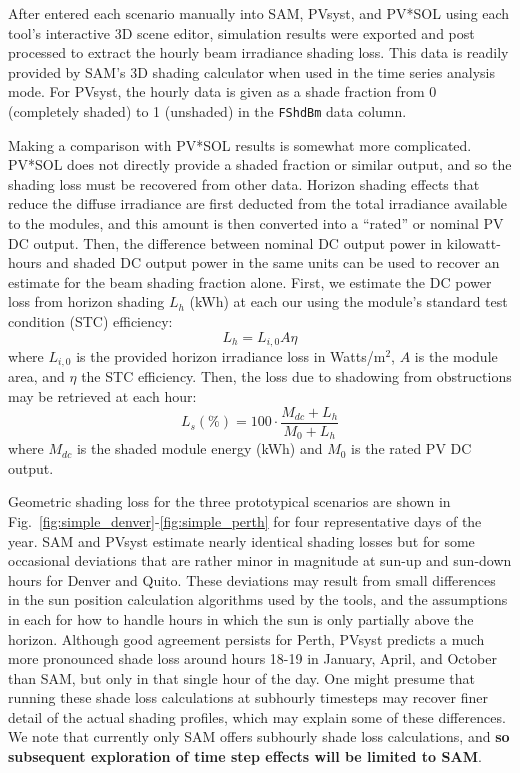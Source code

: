 \documentclass[twocolumn,10pt]{asme2ej}
\begin{document}
After entered each scenario manually into SAM, PVsyst, and PV*SOL using each tool's interactive 3D scene editor, simulation results were exported and post processed to extract the hourly beam irradiance shading loss.  This data is readily provided by SAM's 3D shading calculator when used in the time series analysis mode.  For PVsyst, the hourly data is given as a shade fraction from 0 (completely shaded) to 1 (unshaded) in the \texttt{FShdBm} data column. 

Making a comparison with PV*SOL results is somewhat more complicated.  PV*SOL does not directly provide a shaded fraction or similar output, and so the shading loss must be recovered from other data.  Horizon shading effects that reduce the diffuse irradiance are first deducted from the total irradiance available to the modules, and this amount is then converted into a ``rated'' or nominal PV DC output.  Then, the difference between nominal DC output power in kilowatt-hours and shaded DC output power in the same units can be used to recover an estimate for the beam shading fraction alone.  First, we estimate the DC power loss from horizon shading $L_h$ (kWh) at each our using the module's standard test condition (STC) efficiency:
\begin{equation}\label{eqn:pvsol_lh}
L_h = L_{i,0} A \eta
\end{equation}
where $L_{i,0}$ is the provided horizon irradiance loss in Watts/m$^2$, $A$ is the module area, and $\eta$ the STC efficiency.  Then, the loss due to shadowing from obstructions may be retrieved at each hour:
\begin{equation}\label{eqn:pvsol_ls}
L_s (\%) = 100 \cdot \frac{ M_{dc} + L_h }{ M_{0} + L_h }
\end{equation}
where $M_{dc}$ is the shaded module energy (kWh) and $M_0$ is the rated PV DC output.


Geometric shading loss for the three prototypical scenarios are shown in Fig.~\ref{fig:simple_denver}-\ref{fig:simple_perth} for four representative days of the year.  SAM and PVsyst estimate nearly identical shading losses but for some occasional deviations that are rather minor in magnitude at sun-up and sun-down hours for Denver and Quito.  These deviations may result from small differences in the sun position calculation algorithms used by the tools, and the assumptions in each for how to handle hours in which the sun is only partially above the horizon.  Although good agreement persists for Perth, PVsyst predicts a much more pronounced shade loss around hours 18-19 in January, April, and October than SAM, but only in that single hour of the day.  One might presume that running these shade loss calculations at subhourly timesteps may recover finer detail of the actual shading profiles, which may explain some of these differences.  We note that currently only SAM offers subhourly shade loss calculations, and \textbf{so subsequent exploration of time step effects will be limited to SAM}.
\end{document}
